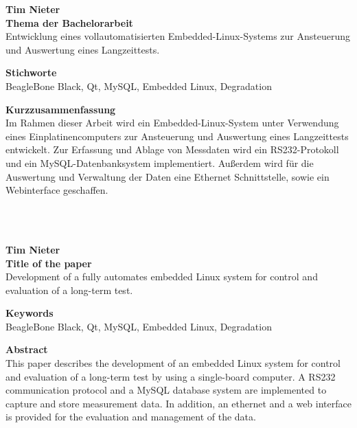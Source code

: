 
\thispagestyle{empty}


{\large \textbf{Tim Nieter}}\\

{\large \textbf{Thema der Bachelorarbeit}}\\
Entwicklung eines vollautomatisierten Embedded-Linux-Systems zur Ansteuerung und Auswertung eines Langzeittests.\

{\large \textbf{Stichworte}}\\
BeagleBone Black, Qt, MySQL, Embedded Linux, Degradation\ 

{\large \textbf{Kurzzusammenfassung}}\\
Im Rahmen dieser Arbeit wird ein Embedded-Linux-System unter Verwendung eines Einplatinencomputers zur Ansteuerung und Auswertung eines Langzeittests entwickelt. Zur Erfassung und Ablage von Messdaten wird ein RS232-Protokoll und ein MySQL-Datenbanksystem implementiert. Außerdem wird für die Auswertung und Verwaltung der Daten eine Ethernet Schnittstelle, sowie ein Webinterface geschaffen.\\
\ 


\ 



{\large \textbf{Tim Nieter}}\\

{\large \textbf{Title of the paper}}\\
Development of a fully automates embedded Linux system for control and evaluation of a long-term test.\ 

{\large \textbf{Keywords}}\\
BeagleBone Black, Qt, MySQL, Embedded Linux, Degradation\ 

{\large \textbf{Abstract}}\\
This paper describes the development of an embedded Linux system for control and evaluation of a long-term test by using a single-board computer. A RS232 communication protocol and a MySQL database system are implemented to capture and store measurement data. In addition, an ethernet and a web interface is provided for the evaluation and management of the data.